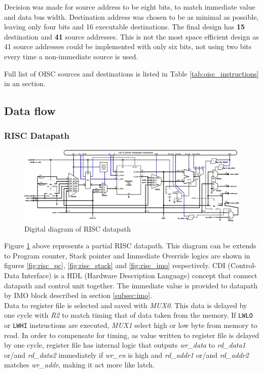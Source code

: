 Decision was made for source address to be eight bits, to match immediate value and data bus width. Destination address was chosen to be as minimal as possible, leaving only four bits and 16 executable destinations. The final design has \textbf{15} destination and \textbf{41} source addresses. This is not the most space efficient design as 41 source addresses could be implemented with only six bits, not using two bits every time a non-immediate source is used.

Full list of OISC sources and destinations is listed in Table \ref{tab:oisc_instructions} in an  section.

\begin{landscape}
	\subsection{Data flow} \label{sec:dataflow}
	\subsubsection{RISC Datapath} \label{subsec:datapath}
	\begin{figure}[h!]
		\centering
		\includegraphics[width=\linewidth]{../resources/datapath.eps}
		\caption{Digital diagram of RISC datapath}
		\label{fig:datapath}	
	\end{figure}
	
	Figure \ref{fig:datapath} above represents a partial RISC datapath. This diagram can be extends to Program counter, Stack pointer and Immediate Override logics are shown in figures \ref{fig:risc_pc}, \ref{fig:risc_stack} and \ref{fig:risc_imo} respectively. CDI (Control-Data Interface) is a HDL (Hardware Description Language) concept that connect datapath and control unit together. The immediate value is provided to datapath by IMO block described in section \ref{subsec:imo}.\\
	Data to register file is selected and saved with \textit{MUX0}. This data is delayed by one cycle with \textit{R2} to match timing that of data taken from the memory. If \texttt{LWLO} or \texttt{LWHI} instructions are executed, \textit{MUX1} select high or low byte from memory to read. In order to compensate for timing, as value written to register file is delayed by one cycle, register file has internal logic that outputs \textit{wr\_data} to \textit{rd\_data1} or/and  \textit{rd\_data2} immediately if \textit{wr\_en} is high and \textit{rd\_addr1} or/and \textit{rd\_addr2} matches \textit{wr\_addr}, making it act more like latch. \\
\end{landscape}
